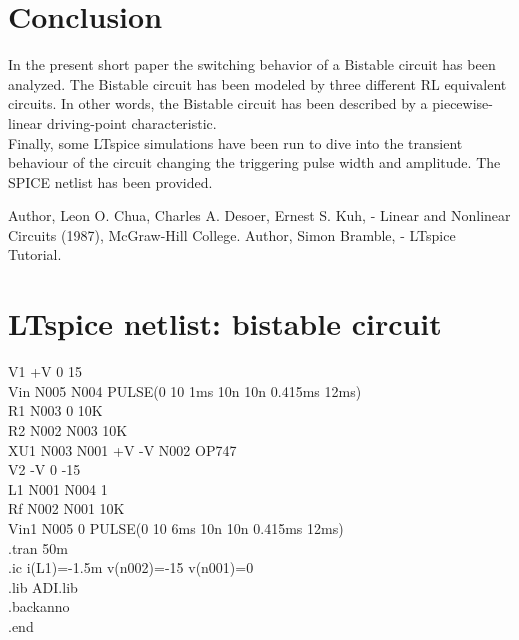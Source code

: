 \documentclass[12pt,a4paper,tweside,onehalfspacing]{article}
\begin{document}
\section{Conclusion}
%
In the present short paper the switching behavior of a Bistable circuit has been analyzed. The Bistable circuit has been modeled by three different RL equivalent circuits. In other words, the Bistable circuit has been described by a piecewise-linear driving-point characteristic.\\
Finally, some LTspice simulations have been run to dive into the transient behaviour of the circuit changing the triggering pulse width and amplitude. The SPICE netlist has been provided.
%
\begin{thebibliography}{99}
Author, Leon O. Chua, Charles A. Desoer, Ernest S. Kuh, - Linear and Nonlinear Circuits (1987), McGraw-Hill College.
Author, Simon Bramble, - LTspice Tutorial.
\end{thebibliography}

%
%
\clearpage
%
\appendix
%
\section{LTspice netlist: bistable circuit}
V1 +V 0 15\\
Vin N005 N004 PULSE(0 10 1ms 10n 10n 0.415ms 12ms)\\
R1 N003 0 10K\\
R2 N002 N003 10K\\
XU1 N003 N001 +V -V N002 OP747\\
V2 -V 0 -15\\
L1 N001 N004 1\\
Rf N002 N001 10K\\
Vin1 N005 0 PULSE(0 10 6ms 10n 10n 0.415ms 12ms)\\
.tran 50m\\
.ic i(L1)=-1.5m v(n002)=-15 v(n001)=0\\
.lib ADI.lib\\
.backanno\\
.end\\
\end{document}
